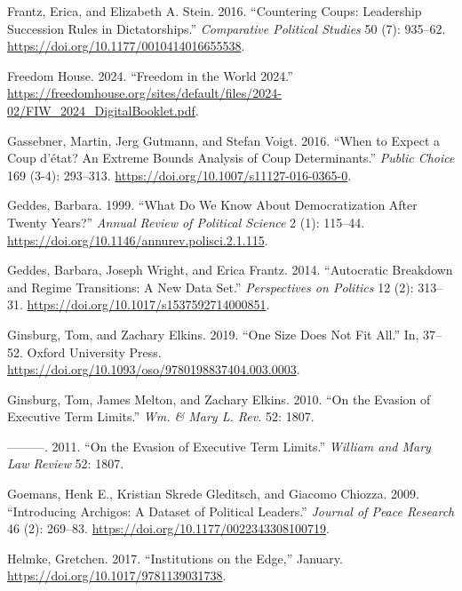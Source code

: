 \documentclass[
  12pt,
]{report}
\newlength{\cslhangindent}
\newenvironment{CSLReferences}[2] %
 {\begin{list}{}{%
  \setlength{\itemindent}{0pt}
  \setlength{\leftmargin}{0pt}
  \setlength{\parsep}{0pt}
  \ifodd #1
   \setlength{\leftmargin}{\cslhangindent}
   \setlength{\itemindent}{-1\cslhangindent}
  \fi
  \setlength{\itemsep}{#2\baselineskip}}}
 {\end{list}}
\begin{document}
\begin{CSLReferences}{1}{0}
Frantz, Erica, and Elizabeth A. Stein. 2016. {``Countering Coups:
Leadership Succession Rules in Dictatorships.''} \emph{Comparative
Political Studies} 50 (7): 935--62.
\url{https://doi.org/10.1177/0010414016655538}.

Freedom House. 2024. {``Freedom in the World 2024.''}
\url{https://freedomhouse.org/sites/default/files/2024-02/FIW_2024_DigitalBooklet.pdf}.

Gassebner, Martin, Jerg Gutmann, and Stefan Voigt. 2016. {``When to
Expect a Coup d{'}état? An Extreme Bounds Analysis of Coup
Determinants.''} \emph{Public Choice} 169 (3-4): 293--313.
\url{https://doi.org/10.1007/s11127-016-0365-0}.

Geddes, Barbara. 1999. {``What Do We Know About Democratization After
Twenty Years?''} \emph{Annual Review of Political Science} 2 (1):
115--44. \url{https://doi.org/10.1146/annurev.polisci.2.1.115}.

Geddes, Barbara, Joseph Wright, and Erica Frantz. 2014. {``Autocratic
Breakdown and Regime Transitions: A New Data Set.''} \emph{Perspectives
on Politics} 12 (2): 313--31.
\url{https://doi.org/10.1017/s1537592714000851}.

Ginsburg, Tom, and Zachary Elkins. 2019. {``One Size Does Not Fit
All.''} In, 37--52. Oxford University Press.
\url{https://doi.org/10.1093/oso/9780198837404.003.0003}.

Ginsburg, Tom, James Melton, and Zachary Elkins. 2010. {``On the Evasion
of Executive Term Limits.''} \emph{Wm. \& Mary L. Rev.} 52: 1807.

---------. 2011. {``On the Evasion of Executive Term Limits.''}
\emph{William and Mary Law Review} 52: 1807.

Goemans, Henk E., Kristian Skrede Gleditsch, and Giacomo Chiozza. 2009.
{``Introducing Archigos: A Dataset of Political Leaders.''}
\emph{Journal of Peace Research} 46 (2): 269--83.
\url{https://doi.org/10.1177/0022343308100719}.

Helmke, Gretchen. 2017. {``Institutions on the Edge,''} January.
\url{https://doi.org/10.1017/9781139031738}.


\end{CSLReferences}
\end{document}
